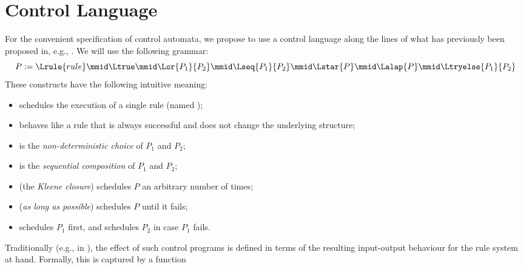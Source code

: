 \section{Control Language}\label{sec:language}


For the convenient specification of control automata, we propose to use a
control language along the lines of what has previously been proposed in, e.g.,
\cite{HabelPlump01}. We will use the following grammar:
%
\[ P := \Lrule{rule} \mmid \Ltrue \mmid \Lor{P_1}{P_2} \mmid \Lseq{P_1}{P_2} \mmid
\Lstar{P} \mmid \Lalap{P} \mmid \Ltryelse{P_1}{P_2} 
\]
%
These constructs have the following intuitive meaning:
\begin{itemize}
\item {} schedules the execution of a single rule (named
  );
\item \Ltrue{} behaves like a rule that is always successful
  and does not change the underlying structure;
\item {} is the \emph{non-deterministic choice} of $P_1$ and $P_2$;
\item {} is the \emph{sequential composition} of $P_1$ and $P_2$;
\item {} (the \emph{Kleene closure}) schedules $P$ an arbitrary number
  of times;
\item {} (\emph{as long as possible}) schedules $P$ until it fails;
\item {} schedules $P_1$ first, and schedules $P_2$ in case
  $P_1$ fails.
\end{itemize}
%
Traditionally (e.g., in \cite{HabelPlump01}), the effect of such control
programs is defined in terms of the resulting input-output behaviour for
the rule system at hand. Formally, this is captured by a function
